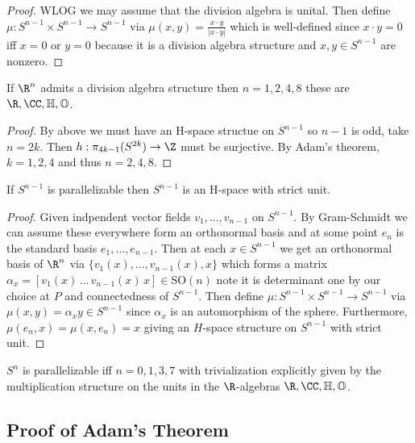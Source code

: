 \documentclass[12pt]{extarticle}
\begin{document}
\begin{proof}
WLOG we may assume that the division algebra is unital. Then define $\mu  : S^{n-1} \times S^{n-1} \to S^{n-1}$ via $\mu(x,y) = \frac{x \cdot y}{|x \cdot y|}$ which is well-defined since $x \cdot y = 0$ iff $x = 0$ or $y = 0$ because it is a division algebra structure and $x,y \in S^{n-1}$ are nonzero.
\end{proof}

\begin{corollary}
If $\R^n$ admits a division algebra structure then $n = 1,2,4,8$ these are $\R, \CC, \mathbb{H}, \mathbb{O}$.
\end{corollary}

\begin{proof}
By above we must have an H-space structue on $S^{n-1}$ so $n-1$ is odd, take $n = 2k$. Then $h : \pi_{4k - 1}(S^{2k}) \to \Z$ must be surjective. By Adam's theorem, $k = 1,2,4$ and thus $n = 2,4,8$. 
\end{proof}

\begin{cor}
If $S^{n-1}$ is parallelizable then $S^{n-1}$ is an H-space with strict unit.
\end{cor}

\begin{proof}
Given indpendent vector fields $v_1, \dots, v_{n-1}$ on $S^{n-1}$. By Gram-Schmidt we can assume these everywhere form an orthonormal basis and at some point $e_n$ is the standard basis $e_1, \dots, e_{n-1}$. Then at each $x \in S^{n-1}$ we get an orthonormal basis of $\R^n$ via $\{v_1(x), \dots, v_{n-1}(x), x \}$ which forms a matrix $\alpha_x =  [v_1(x) \, \dots \, v_{n-1}(x) \, x] \in \mathrm{SO}(n)$ note it is determinant one by our choice at $P$ and connectedness of $S^{n-1}$. Then define $\mu : S^{n-1} \times S^{n-1} \to S^{n-1}$ via $\mu(x,y) = \alpha_x y \in S^{n-1}$ since $\alpha_x$ is an automorphism of the sphere. Furthermore, $\mu(e_n, x) = \mu(x, e_n) = x$ giving an $H$-space structure on $S^{n-1}$ with strict unit. 
\end{proof}

\begin{cor}
$S^n$ is parallelizable iff $n = 0,1,3,7$ with trivialization explicitly given by the multiplication structure on the units in the $\R$-algebras $\R, \CC, \mathbb{H}, \mathbb{O}$.
\end{cor}

\subsection{Proof of Adam's Theorem}
\end{document}
